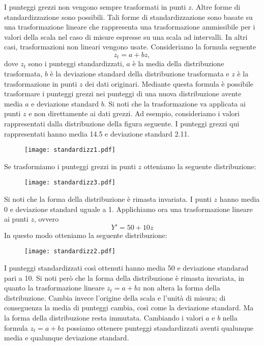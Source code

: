 I punteggi grezzi non vengono sempre trasformati in punti $z$. Altre forme di standardizzazione sono possibili.
 Tali forme di standardizzazione sono basate su una trasformazione lineare che rappresenta una trasformazione ammissibile per i valori della scala nel caso di misure espresse su una scala ad intervalli.
In altri casi, trasformazioni non lineari vengono usate.
Consideriamo la formula seguente
$$
z_t = a + bz,
$$
dove $z_t$ sono i punteggi standardizzati, $a$ è la media della distribuzione trasformata, $b$ è la deviazione standard della distribuzione trasformata e $z$ è la trasformazione in punti $z$ dei dati originari.
Mediante questa formula è possibile trasformare i punteggi grezzi nei punteggi di una nuova distribuzione avente media $a$ e deviazione standard $b$.
Si noti che la trasformazione va applicata ai punti $z$ e non direttamente ai dati grezzi.
Ad esempio, consideriamo i valori rappresentati dalla distribuzione della figura seguente.
I punteggi grezzi qui rappresentati hanno media 14.5 e deviazione standard 2.11.

\begin{figure}[h!]
\begin{center}
\texttt{[image: standardizz1.pdf]}
\end{center}
\end{figure}
Se trasformiamo i punteggi grezzi in punti $z$ otteniamo la seguente distribuzione:
\begin{figure}[h!]
\begin{center}
\texttt{[image: standardizz3.pdf]}
\end{center}
\end{figure}
Si noti che la forma della distribuzione è rimasta invariata.
 I punti $z$ hanno media 0 e deviazione standard uguale a 1.
Applichiamo ora una trasformazione lineare ai punti $z$, ovvero
$$
Y' = 50 + 10 z
$$
In questo modo otteniamo la seguente distribuzione:
\begin{figure}[h!]
\begin{center}
\texttt{[image: standardizz2.pdf]}
\end{center}
\end{figure}
I punteggi standardizzati così ottenuti hanno media 50 e deviazione standarad pari a 10.
Si noti però che la forma della distribuzione è rimasta invariata, in quanto la trasformazione lineare $z_t = a + bz$ non  altera la forma della distribuzione.
Cambia invece l'origine della scala e l'unità di misura; di conseguenza la media di punteggi cambia, così come la deviazione standard.
Ma la forma della distribuzione resta immutata.
Cambiando i valori $a$ e $b$ nella formula $z_t = a + bz$ possiamo ottenere punteggi standardizzati aventi qualunque media e qualunque deviazione standard.


